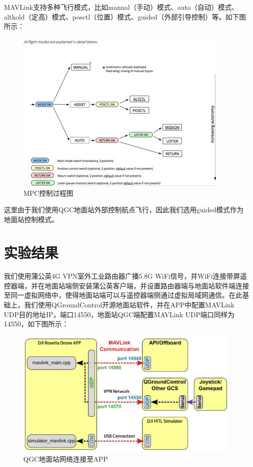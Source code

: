MAVLink支持多种飞行模式，比如manual（手动）模式、auto（自动）模式、althold（定高）模式、posctl（位置）模式、guided（外部引导控制）等。如下图所示：

\begin{figure}[ht]
  \centering
  \includegraphics[width=0.8\linewidth]{./Figure/Flight_Mode.png}
  \caption{MPC控制过程图}\label{Fig:xd1}
\end{figure}

这里由于我们使用QGC地面站外部控制航点飞行，因此我们选用guided模式作为地面站控制模式。

\chapter{实验结果}

我们使用蒲公英4G VPN室外工业路由器广播5.8G WiFi信号，并WiFi连接带屏遥控器端，并在地面站端侧安装蒲公英客户端，并设置路由器端与地面站软件端连接至同一虚拟网络中，使得地面站端可以与遥控器端侧通过虚拟局域网通信。在此基础上，我们使用QGroundControl开源地面站软件，并在APP中配置MAVLink UDP目的地址IP，端口14550，地面站QGC端配置MAVLink UDP端口同样为14550，如下图所示：

\begin{figure}[ht]
  \centering
  \includegraphics[width=0.8\linewidth]{./Figure/QGC_Connect_to_APP.png}
  \caption{QGC地面站网络连接至APP}\label{Fig:xd1}
\end{figure}

